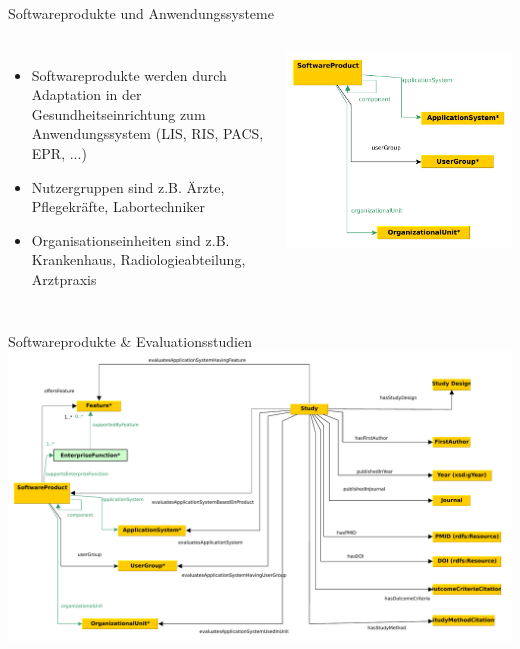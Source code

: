 \documentclass[aspectratio=1610,12pt]{beamer}
\begin{document}
\begin{frame}{Softwareprodukte und Anwendungssysteme}
\begin{columns}
  \begin{itemize}
    \item Softwareprodukte werden durch Adaptation in der Gesundheitseinrichtung zum Anwendungssystem (LIS, RIS, PACS, EPR, ...)
    \item Nutzergruppen sind z.B. Ärzte, Pflegekräfte, Labortechniker
    \item Organisationseinheiten sind z.B. Krankenhaus, Radiologieabteilung, Arztpraxis
  \end{itemize}
\includegraphics[width=\textwidth]{img/excerpt4.pdf}
\end{columns}
\end{frame}

\begin{frame}{Softwareprodukte \& Evaluationsstudien}
\centering
\includegraphics[width=.95\textwidth]{img/excerpt5.pdf}
\end{frame}
\end{document}
